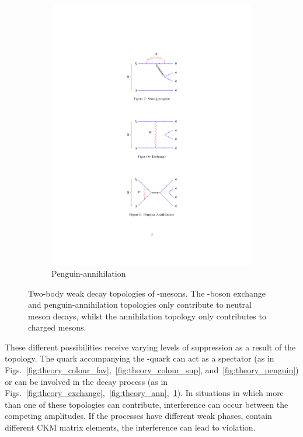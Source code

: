 \begin{figure}[!h]
\begin{subfigure}[b]{0.32\textwidth}
        \includegraphics[width=1.0\textwidth]{figs/Theory/PengAn.pdf}
        \caption{Penguin-annihilation}
        \label{fig:theory_peng_ann}
    \end{subfigure}
    \caption{Two-body weak decay topologies of \bquark-mesons. The \W-boson exchange and penguin-annihilation topologies only contribute to neutral \B meson decays, whilst the annihilation topology only contributes to charged \B mesons.}
    \label{fig:Theory_topo}   
\end{figure}
These different possibilities receive varying levels of suppression as a result of the topology. The quark accompanying the \bquark-quark can act as a spectator (as in Figs.~\ref{fig:theory_colour_fav},~\ref{fig:theory_colour_sup}, and~\ref{fig:theory_penguin}) or can be involved in the decay process (as in Figs.~\ref{fig:theory_exchange},~\ref{fig:theory_ann},~\ref{fig:theory_peng_ann}).   
In situations in which more than one of these topologies can contribute, interference can occur between the competing amplitudes. If the processes have different weak phases, \ie contain different CKM matrix elements, the interference can lead to \CP violation.  


